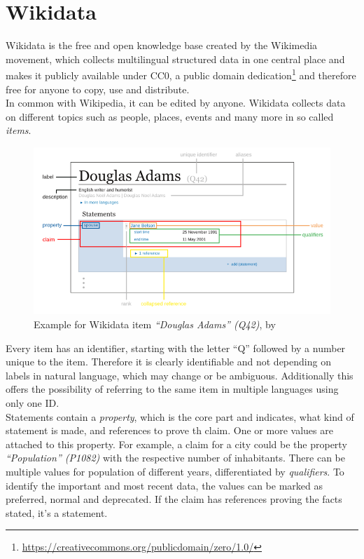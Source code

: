 \section{Wikidata}

Wikidata is the free and open knowledge base created by the Wikimedia movement, which collects multilingual structured data in one central place and makes it publicly available under CC0, a public domain dedication\footnote{\href{https://creativecommons.org/publicdomain/zero/1.0/}{https://creativecommons.org/publicdomain/zero/1.0/}} and therefore free for anyone to copy, use and distribute. \\
In common with Wikipedia, it can be edited by anyone. Wikidata collects data on different topics such as people, places, events and many more in so called \textit{items}.
\begin{figure}[H]
	\centering
	\includegraphics[width=\textwidth]{diagrams/Wikidata_statement.png}
	\caption{Example for Wikidata item \textit{``Douglas Adams'' (Q42)}, by \citet{kritschmar}}
	\label{diagramWikidataStatement}
\end{figure}
Every item has an identifier, starting with the letter ``Q'' followed by a number unique to the item. Therefore it is clearly identifiable and not depending on labels in natural language, which may change or be ambiguous. Additionally this offers the possibility of referring to the same item in multiple languages using only one ID. \\
Statements contain a \textit{property}, which is the core part and indicates, what kind of statement is made, and references to prove th claim. One or more values are attached to this property. For example, a claim for a city could be the property \textit{``Population'' (P1082)} with the respective number of inhabitants. There can be multiple values for population of different years, differentiated by \textit{qualifiers}. To identify the important and most recent data, the values can be marked as preferred, normal and deprecated. If the claim has references proving the facts stated, it's a statement. \\
